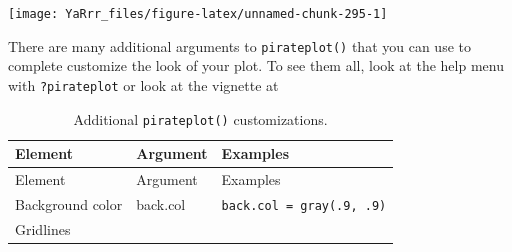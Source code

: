 \documentclass[]{book}
\theoremstyle{definition}
\theoremstyle{definition}
\theoremstyle{remark}
\begin{document}
\begin{center}\texttt{[image: YaRrr\_files/figure-latex/unnamed-chunk-295-1]} \end{center}

There are many additional arguments to \texttt{pirateplot()} that you
can use to complete customize the look of your plot. To see them all,
look at the help menu with \texttt{?pirateplot} or look at the vignette
at \href{}{}

\begin{longtable}[]{@{}lll@{}}
\caption{\label{tab:pirateplotcustomisation} Additional
\texttt{pirateplot()} customizations.}\tabularnewline
\toprule
\begin{minipage}[b]{0.19\columnwidth}\raggedright\strut
Element\strut
\end{minipage} & \begin{minipage}[b]{0.24\columnwidth}\raggedright\strut
Argument\strut
\end{minipage} & \begin{minipage}[b]{0.48\columnwidth}\raggedright\strut
Examples\strut
\end{minipage}\tabularnewline
\midrule
\endfirsthead
\toprule
\begin{minipage}[b]{0.19\columnwidth}\raggedright\strut
Element\strut
\end{minipage} & \begin{minipage}[b]{0.24\columnwidth}\raggedright\strut
Argument\strut
\end{minipage} & \begin{minipage}[b]{0.48\columnwidth}\raggedright\strut
Examples\strut
\end{minipage}\tabularnewline
\midrule
\endhead
\begin{minipage}[t]{0.19\columnwidth}\raggedright\strut
Background color\strut
\end{minipage} & \begin{minipage}[t]{0.24\columnwidth}\raggedright\strut
back.col\strut
\end{minipage} & \begin{minipage}[t]{0.48\columnwidth}\raggedright\strut
\texttt{back.col\ =\ \textquotesingle{}gray(.9,\ .9)\textquotesingle{}}\strut
\end{minipage}\tabularnewline
\begin{minipage}[t]{0.19\columnwidth}\raggedright\strut
Gridlines\strut
\end{minipage} & \begin{minipage}[t]{0.24\columnwidth}\raggedright\strut

\end{minipage}
\end{longtable}
\end{document}
